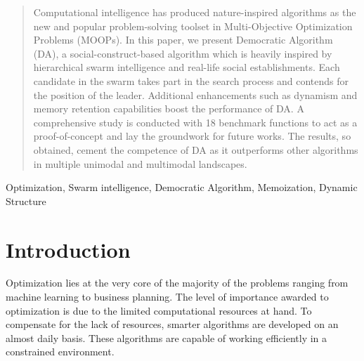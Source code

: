 \documentclass[conference]{IEEEtran}
\begin{document}
\begin{abstract}
Computational intelligence has produced nature-inspired algorithms as the new and popular problem-solving toolset in Multi-Objective Optimization Problems (MOOPs). In this paper, we present Democratic Algorithm (DA), a social-construct-based algorithm which is heavily inspired by hierarchical swarm intelligence and real-life social establishments. Each candidate in the swarm takes part in the search process and contends for the position of the leader. Additional enhancements such as dynamism and memory retention capabilities boost the performance of DA. A comprehensive study is conducted with 18 benchmark functions to act as a proof-of-concept and lay the groundwork for future works. The results, so obtained, cement the competence of DA as it outperforms other algorithms in multiple unimodal and multimodal landscapes.
\end{abstract}

\begin{IEEEkeywords}
Optimization, Swarm intelligence, Democratic Algorithm, Memoization, Dynamic Structure
\end{IEEEkeywords}

\section{Introduction}

Optimization lies at the very core of the majority of the problems ranging from machine learning to business planning. The level of importance awarded to optimization is due to the limited computational resources at hand. To compensate for the lack of resources, smarter algorithms are developed on an almost daily basis. These algorithms are capable of working efficiently in a constrained environment. 
\end{document}
